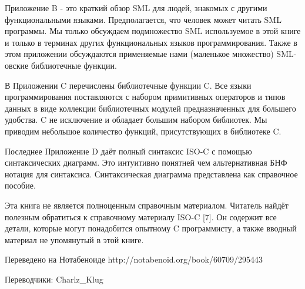 Приложение B - это краткий обзор SML для людей, знакомых с другими функциональными языками. Предполагается, что человек может читать SML программы. Мы только обсуждаем подмножество SML используемое в этой книге и только в терминах других функциональных языков программирования. Также в этом приложении обсуждаются применяемые нами (маленькое множество) SML-овские библиотечные функции.

В Приложении C перечислены библиотечные функции C. Все языки программирования поставляются с набором примитивных операторов и типов данных в виде коллекции библиотечных модулей предназначенных для большего удобства. C не исключение и обладает большим набором библиотек. Мы приводим небольшое количество функций, присутствующих в библиотеке C.

Последнее Приложение D даёт полный синтаксис ISO-C с помощью синтаксических диаграмм. Это интуитивно понятней чем альтернативная БНФ нотация для синтаксиса. Синтаксическая диаграмма представлена как справочное пособие.

Эта книга не является полноценным справочным материалом. Читатель найдёт полезным обратиться к справочному материалу ISO-C [7]. Он содержит все детали, которые могут понадобится опытному C программисту, а также вводный материал не упомянутый в этой книге.

Переведено на Нотабеноиде
http://notabenoid.org/book/60709/295443

Переводчики: Charlz_Klug
